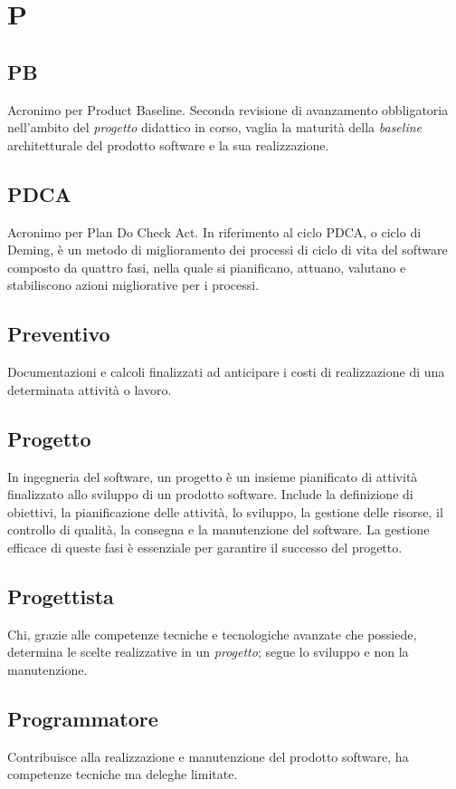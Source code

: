 \chapter{P}

\section{PB}
Acronimo per Product Baseline. Seconda revisione di avanzamento obbligatoria nell'ambito del \emph{progetto} didattico in corso, vaglia la maturità della \emph{baseline} architetturale del prodotto software e la sua realizzazione.

\section{PDCA}
Acronimo per Plan Do Check Act. In riferimento al ciclo PDCA, o ciclo di Deming, è un metodo di miglioramento dei processi di ciclo di vita del software composto da quattro fasi, nella quale si pianificano, attuano, valutano e stabiliscono azioni migliorative per i processi.

\section{Preventivo}
Documentazioni e calcoli finalizzati ad anticipare i costi di realizzazione di una determinata attività o lavoro.       

\section{Progetto}
In ingegneria del software, un progetto è un insieme pianificato di attività finalizzato allo sviluppo di un prodotto software. Include la definizione di obiettivi, la pianificazione delle attività, lo sviluppo, la gestione delle risorse, il controllo di qualità, la consegna e la manutenzione del software. La gestione efficace di queste fasi è essenziale per garantire il successo del progetto.

\section{Progettista}
Chi, grazie alle competenze tecniche e tecnologiche avanzate che possiede, determina le scelte realizzative in un \emph{progetto}; segue lo sviluppo e non la manutenzione.

\section{Programmatore}
Contribuisce alla realizzazione e manutenzione del prodotto software, ha competenze tecniche ma deleghe limitate.

